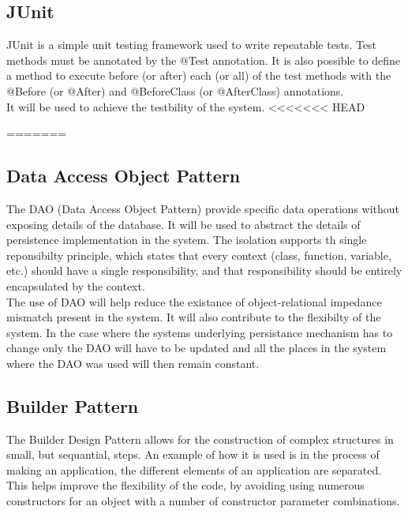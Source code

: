 \documentclass[12pt]{article}
\begin{document}
\subsection{JUnit}
JUnit is a simple unit testing framework used to write repeatable tests. Test methods must be annotated by the @Test annotation. It is also possible to define a method to execute before (or after) each (or all) of the test methods with the @Before (or @After) and @BeforeClass (or @AfterClass) annotations. \\

It will be used to achieve the testbility of the system.
<<<<<<< HEAD

=======
\subsection{Data Access Object Pattern}
The DAO (Data Access Object Pattern) provide specific data operations without exposing details of the database. It will be used to abstract the details of persistence implementation in the system. The isolation supports th single reponsibilty principle, which states that every context (class, function, variable, etc.) should have a single responsibility, and that responsibility should be entirely encapsulated by the context.\\

The use of DAO will help reduce the existance of object-relational impedance mismatch present in the system. It will also contribute to the flexibilty of the system. In the case where the systems underlying persistance mechanism has to change only the DAO will have to be updated and all the places in the system where the DAO was used will then remain constant.
\subsection{Builder Pattern}
The Builder Design Pattern allows for the construction of complex structures in small, but sequantial, steps. An example of how it is used is in the process of making an application, the different elements of an application are separated. This helps improve the flexibility of the code, by avoiding using numerous constructors for an object with a number of constructor parameter combinations.  
\end{document}
